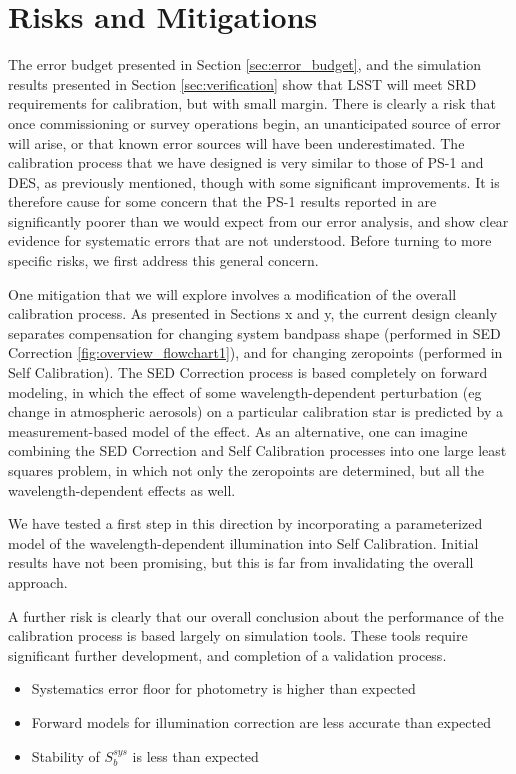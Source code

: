 \documentclass[12pt,preprint]{aastex}
\begin{document}
\section{Risks and Mitigations}
\label{sec:risks}
The error budget presented in Section \ref{sec:error_budget}, and the simulation results presented in Section \ref{sec:verification} show that
LSST will meet SRD requirements for calibration, but with small margin.   There is clearly a risk
that once commissioning or survey operations begin, an unanticipated source of error will arise, or
that known error sources will have been underestimated.
The calibration process that we have designed is very similar to those of PS-1 and DES, as previously mentioned, though with some significant improvements.  It is therefore
cause for some concern that the PS-1 results reported in \citep{Tonry2012} are 
significantly poorer than we would expect from our
error analysis, and show clear evidence for systematic errors that are not understood.
Before turning to more specific risks, we first address this general concern.

One mitigation that we will explore involves a modification of the overall calibration process.  As presented in Sections x and y, the current design cleanly separates compensation for changing system
bandpass shape (performed in SED Correction \ref{fig:overview_flowchart1}), and for changing zeropoints
(performed in Self Calibration).  The SED Correction process is based completely on forward modeling,
in which the effect of some wavelength-dependent perturbation (eg change in atmospheric aerosols) on
a particular calibration star is predicted by a measurement-based model of the effect.  As
an alternative, one can imagine combining the SED Correction and Self Calibration processes into one
large least squares problem, in which not only the zeropoints are determined, but all the 
wavelength-dependent effects as well.  

We have tested a first step in this direction by incorporating
a parameterized model of the wavelength-dependent illumination into Self Calibration.  Initial 
results have not been promising, but this is far from invalidating the overall approach.

A further risk is clearly that our overall conclusion about the performance of the calibration process is based largely on
simulation tools.  These tools require significant further development, and completion of a validation process.

\begin{itemize}
\item Systematics error floor for photometry is higher than expected
\item Forward models for illumination correction are less accurate than expected
\item Stability of $S_b^{sys}$ is less than expected
\end{itemize}
\end{document}
